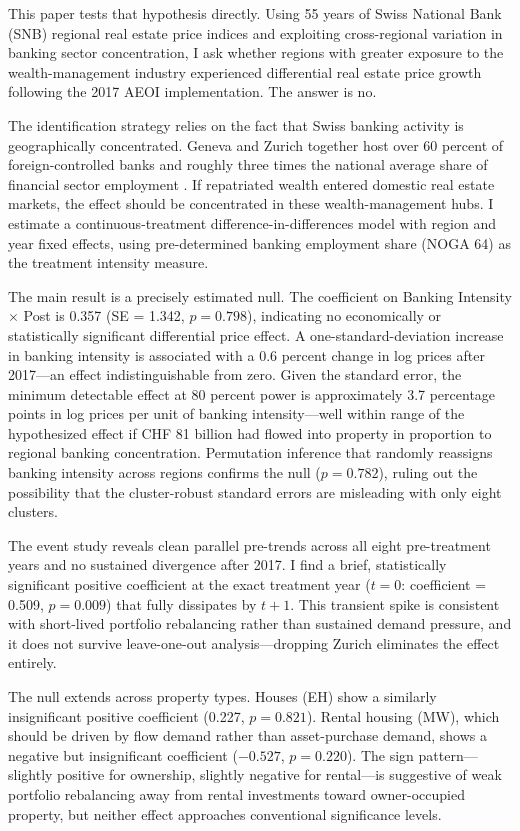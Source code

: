 \documentclass[12pt]{article}
\begin{document}
This paper tests that hypothesis directly. Using 55 years of Swiss National Bank (SNB) regional real estate price indices and exploiting cross-regional variation in banking sector concentration, I ask whether regions with greater exposure to the wealth-management industry experienced differential real estate price growth following the 2017 AEOI implementation. The answer is no.

The identification strategy relies on the fact that Swiss banking activity is geographically concentrated. Geneva and Zurich together host over 60 percent of foreign-controlled banks and roughly three times the national average share of financial sector employment \citep{lambelet2003swiss}. If repatriated wealth entered domestic real estate markets, the effect should be concentrated in these wealth-management hubs. I estimate a continuous-treatment difference-in-differences model with region and year fixed effects, using pre-determined banking employment share (NOGA 64) as the treatment intensity measure.

The main result is a precisely estimated null. The coefficient on Banking Intensity $\times$ Post is 0.357 (SE = 1.342, $p = 0.798$), indicating no economically or statistically significant differential price effect. A one-standard-deviation increase in banking intensity is associated with a 0.6 percent change in log prices after 2017---an effect indistinguishable from zero. Given the standard error, the minimum detectable effect at 80 percent power is approximately 3.7 percentage points in log prices per unit of banking intensity---well within range of the hypothesized effect if CHF 81 billion had flowed into property in proportion to regional banking concentration. Permutation inference that randomly reassigns banking intensity across regions confirms the null ($p = 0.782$), ruling out the possibility that the cluster-robust standard errors are misleading with only eight clusters.

The event study reveals clean parallel pre-trends across all eight pre-treatment years and no sustained divergence after 2017. I find a brief, statistically significant positive coefficient at the exact treatment year ($t = 0$: coefficient = 0.509, $p = 0.009$) that fully dissipates by $t + 1$. This transient spike is consistent with short-lived portfolio rebalancing rather than sustained demand pressure, and it does not survive leave-one-out analysis---dropping Zurich eliminates the effect entirely.

The null extends across property types. Houses (EH) show a similarly insignificant positive coefficient (0.227, $p = 0.821$). Rental housing (MW), which should be driven by flow demand rather than asset-purchase demand, shows a negative but insignificant coefficient ($-0.527$, $p = 0.220$). The sign pattern---slightly positive for ownership, slightly negative for rental---is suggestive of weak portfolio rebalancing away from rental investments toward owner-occupied property, but neither effect approaches conventional significance levels.
\end{document}
